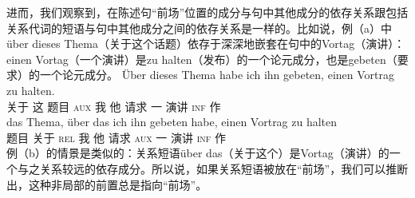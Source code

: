 进而，我们观察到，在陈述句“前场”位置的成分与句中其他成分的依存关系跟包括关系代词的短语与句中其他成分之间的依存关系是一样的。比如说，例（a）中über dieses Thema（关于这个话题）依存于深深地嵌套在句中的Vortag（演讲）：einen Vortag（一个演讲）是zu halten（发布）的一个论元成分，也是gebeten（要求）的一个论元成分。
\eal
\ex 
\gll Über dieses Thema habe ich ihn gebeten, einen Vortrag zu halten.\\
      关于 这 题目  \textsc{aux} 我   他 请求    一     演讲   \textsc{inf} 作\\
\ex 
\gll das Thema, über das ich ihn gebeten habe, einen Vortrag zu halten\\
      题目  关于  \textsc{rel} 我 他 请求  \textsc{aux} 一 演讲 \textsc{inf} 作\\
\zl
例（b）的情景是类似的：关系短语über das（关于这个）是Vortag（演讲）的一个与之关系较远的依存成分。所以说，如果关系短语被放在“前场”，我们可以推断出，这种非局部的前置总是指向“前场”。

